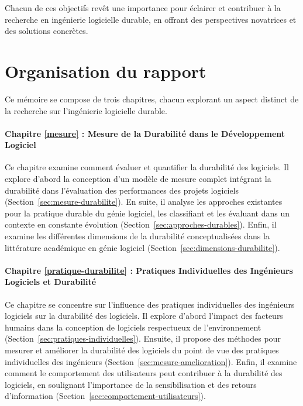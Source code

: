 Chacun de ces objectifs revêt une importance pour éclairer et contribuer à la recherche en ingénierie logicielle durable, en offrant des perspectives novatrices et des solutions concrètes.

\section{Organisation du rapport}
\label{sec:Ch0.4}
Ce mémoire se compose de trois chapitres, chacun explorant un aspect distinct de la recherche sur l'ingénierie logicielle durable.

\paragraph{Chapitre \ref{mesure} : Mesure de la Durabilité dans le Développement Logiciel}
Ce chapitre examine comment évaluer et quantifier la durabilité des logiciels. Il explore d'abord la conception d'un modèle de mesure complet intégrant la durabilité dans l'évaluation des performances des projets logiciels (Section~\ref{sec:mesure-durabilite}). En suite, il analyse les approches existantes pour la pratique durable du génie logiciel, les classifiant et les évaluant dans un contexte en constante évolution (Section~\ref{sec:approches-durables}). Enfin, il examine les différentes dimensions de la durabilité conceptualisées dans la littérature académique en génie logiciel (Section~\ref{sec:dimensions-durabilite}).

\paragraph{Chapitre \ref{pratique-durabilite} : Pratiques Individuelles des Ingénieurs Logiciels et Durabilité}
Ce chapitre se concentre sur l'influence des pratiques individuelles des ingénieurs logiciels sur la durabilité des logiciels. Il explore d'abord l'impact des facteurs humains dans la conception de logiciels respectueux de l'environnement (Section~\ref{sec:pratiques-individuelles}). Ensuite, il propose des méthodes pour mesurer et améliorer la durabilité des logiciels du point de vue des pratiques individuelles des ingénieurs (Section~\ref{sec:mesure-amelioration}). Enfin, il examine comment le comportement des utilisateurs peut contribuer à la durabilité des logiciels, en soulignant l'importance de la sensibilisation et des retours d'information (Section~\ref{sec:comportement-utilisateurs}).

